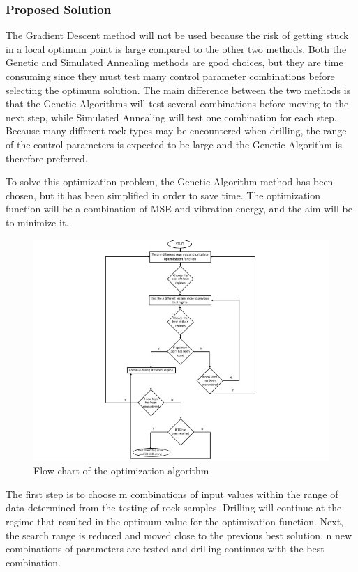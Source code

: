 \subsubsection{Proposed Solution}

The Gradient Descent method will not be used because the risk of getting stuck in a local optimum point is large compared to the other two methods. Both the Genetic and Simulated Annealing methods are good choices, but they are time consuming since they must test many control parameter combinations before selecting the optimum solution. The main difference between the two methods is that the Genetic Algorithms will test several combinations before moving to the next step, while Simulated Annealing will test one combination for each step. Because many different rock types may be encountered when drilling, the range of the control parameters is expected to be large and the Genetic Algorithm is therefore preferred.

To solve this optimization problem, the Genetic Algorithm method has been chosen, but it has been simplified in order to save time. The optimization function will be a combination of MSE and vibration energy, and the aim will be to minimize it.

\begin{figure} [H]
\centering
\includegraphics[width=1.0\textwidth]{figures/OptAlg.jpg}
\caption{Flow chart of the optimization algorithm}
\label{fig:optialgo}
\end{figure}

The first step is to choose m combinations of input values within the range of data determined from the testing of rock samples. Drilling will continue at the regime that resulted in the optimum value for the optimization function. Next, the search range is reduced and moved close to the previous best solution. n new combinations of parameters are tested and drilling continues with the best combination. 

